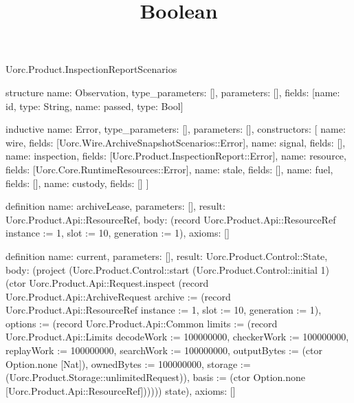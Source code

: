 \begin{lexlean}{Uorc.Product.InspectionReportScenarios}
\title{Boolean}
\begin{semanticmodule}
structure{
  name: Observation,
  type_parameters: [],
  parameters: [],
  fields: [{name: id, type: String}, {name: passed, type: Bool}]
}

inductive{
  name: Error,
  type_parameters: [],
  parameters: [],
  constructors: [
    {name: wire, fields: [Uorc.Wire.ArchiveSnapshotScenarios::Error]},
    {name: signal, fields: []},
    {name: inspection, fields: [Uorc.Product.InspectionReport::Error]},
    {name: resource, fields: [Uorc.Core.RuntimeResources::Error]},
    {name: stale, fields: []},
    {name: fuel, fields: []},
    {name: custody, fields: []}
  ]
}

definition{
  name: archiveLease,
  parameters: [],
  result: Uorc.Product.Api::ResourceRef,
  body: (record Uorc.Product.Api::ResourceRef {instance := 1, slot := 10, generation := 1}),
  axioms: []
}

definition{
  name: current,
  parameters: [],
  result: Uorc.Product.Control::State,
  body: (project (Uorc.Product.Control::start (Uorc.Product.Control::initial 1) (ctor Uorc.Product.Api::Request.inspect (record Uorc.Product.Api::ArchiveRequest {archive := (record Uorc.Product.Api::ResourceRef {instance := 1, slot := 10, generation := 1}), options := (record Uorc.Product.Api::Common {limits := (record Uorc.Product.Api::Limits {decodeWork := 100000000, checkerWork := 100000000, replayWork := 100000000, searchWork := 100000000, outputBytes := (ctor Option.none [Nat]), ownedBytes := 100000000, storage := (Uorc.Product.Storage::unlimitedRequest)}), basis := (ctor Option.none [Uorc.Product.Api::ResourceRef])})}))) state),
  axioms: []
}


\end{semanticmodule}
\end{lexlean}
